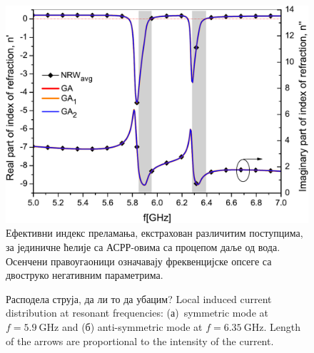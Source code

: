 \begin{figure}[!t]
\centering
\includegraphics[scale=\SkalaB]{slike/8b.pdf}
\caption{Ефективни индекс преламања, екстрахован различитим поступцима, за јединичне ћелије са АСРР-овима са процепом даље од вода. Осенчени правоугаоници означавају фреквенцијске опсеге са двоструко негативним параметрима.}
\label{fig8b}
\end{figure} 
\begin{figure}[!t]
\hfill
{}
\caption{Расподела струја, да ли то да убацим? Local induced current distribution at resonant frequencies: (а)~symmetric mode at $f=\SI{5.9}{\giga\hertz}$ and (б) anti-symmetric mode at $f=\SI{6.35}{\giga\hertz}$. Length of the arrows are proportional to the intensity of the current.}
\label{fig9}
\end{figure}

